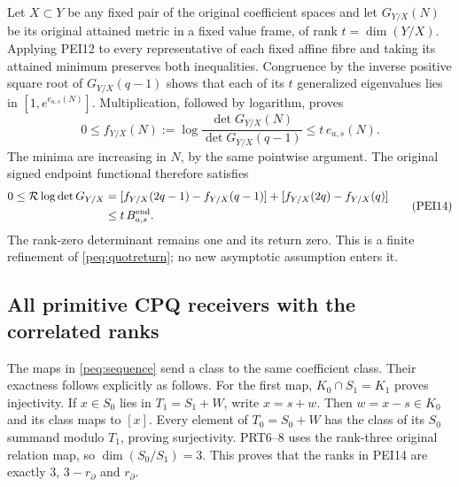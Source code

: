 \documentclass[11pt,a4paper]{article}
\begin{document}
Let $X\subset Y$ be any fixed pair of the original coefficient
spaces and let $G_{Y/X}(N)$ be its original attained metric in a
fixed value frame, of rank $t=\dim(Y/X)$. Applying PEI12 to every
representative of each fixed affine fibre and taking its attained
minimum preserves both inequalities. Congruence by the inverse
positive square root of $G_{Y/X}(q-1)$ shows that each of its $t$
generalized eigenvalues lies in $[1,e^{e_{a,s}(N)}]$. Multiplication,
followed by logarithm, proves
\[
 0\le f_{Y/X}(N):=
       \log\frac{\det G_{Y/X}(N)}{\det G_{Y/X}(q-1)}
       \le t\,e_{a,s}(N).
                                                               \tag{PEI13}
\]
The minima are increasing in $N$, by the same pointwise argument.
The original signed endpoint functional therefore satisfies
\[
 \begin{split}
 0\le\mathcal R\log\det G_{Y/X}
   &=[f_{Y/X}(2q-1)-f_{Y/X}(q-1)]
          +[f_{Y/X}(2q)-f_{Y/X}(q)]\\
   &\le t\,B^{\rm end}_{a,s}.
 \end{split}                                                     \tag{PEI14}
\]
The rank-zero determinant remains one and its return zero.
This is a finite refinement of \eqref{peq:quotreturn}; no new
asymptotic assumption enters it.

\subsection{All primitive CPQ receivers with the correlated ranks}

The maps in \eqref{peq:sequence} send a class to the same coefficient
class. Their exactness follows explicitly as follows. For the first
map, $K_0\cap S_1=K_1$ proves injectivity. If $x\in S_0$ lies in
$T_1=S_1+W$, write $x=s+w$. Then $w=x-s\in K_0$ and its class
maps to $[x]$. Every element of $T_0=S_0+W$ has the class of its
$S_0$ summand modulo $T_1$, proving surjectivity. PRT6--8 uses the
rank-three original relation map, so $\dim(S_0/S_1)=3$.
This proves that the ranks in PEI14 are exactly $3$, $3-r_\partial$
and $r_\partial$.
\end{document}
